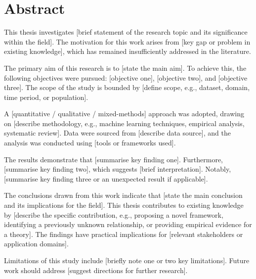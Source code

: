 \chapter*{Abstract}


This thesis investigates [brief statement of the research topic and its significance within the field]. The motivation for this work arises from [key gap or problem in existing knowledge], which has remained insufficiently addressed in the literature.

The primary aim of this research is to [state the main aim]. To achieve this, the following objectives were pursued: [objective one], [objective two], and [objective three]. The scope of the study is bounded by [define scope, e.g., dataset, domain, time period, or population].

A [quantitative / qualitative / mixed-methods] approach was adopted, drawing on [describe methodology, e.g., machine learning techniques, empirical analysis, systematic review]. Data were sourced from [describe data source], and the analysis was conducted using [tools or frameworks used].

The results demonstrate that [summarise key finding one]. Furthermore, [summarise key finding two], which suggests [brief interpretation]. Notably, [summarise key finding three or an unexpected result if applicable].

The conclusions drawn from this work indicate that [state the main conclusion and its implications for the field]. This thesis contributes to existing knowledge by [describe the specific contribution, e.g., proposing a novel framework, identifying a previously unknown relationship, or providing empirical evidence for a theory]. The findings have practical implications for [relevant stakeholders or application domains].

Limitations of this study include [briefly note one or two key limitations]. Future work should address [suggest directions for further research].

